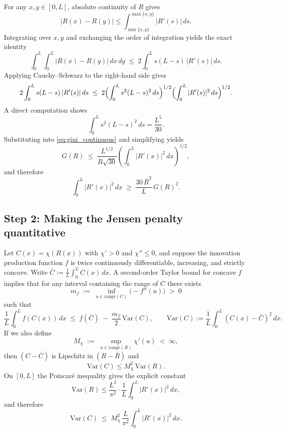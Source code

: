 \documentclass[12pt,a4paper]{article}
\theoremstyle{definition}
\begin{document}
For any $x,y\in[0,L]$, absolute continuity of $R$ gives
\[
|R(x)-R(y)| \le \int_{\min\{x,y\}}^{\max\{x,y\}} |R'(s)|\,ds.
\]
Integrating over $x,y$ and exchanging the order of integration yields the exact identity
\begin{equation}
  \int_0^L\int_0^L |R(x)-R(y)|\,dx\,dy
  \;\le\;
  2\int_0^L s(L-s)\,|R'(s)|\,ds.
  \label{eq:double_integral_weight}
\end{equation}
Applying Cauchy--Schwarz to the right-hand side gives
\[
2\int_0^L s(L-s)\,|R'(s)|\,ds
\;\le\;
2\Bigl(\int_0^L s^2(L-s)^2\,ds\Bigr)^{1/2}\Bigl(\int_0^L |R'(s)|^2\,ds\Bigr)^{1/2}.
\]
A direct computation shows
\[
\int_0^L s^2(L-s)^2\,ds = \frac{L^5}{30}.
\]
Substituting into \eqref{eq:gini_continuous} and simplifying yields
\begin{equation}
  G(R)
  \;\le\;
  \frac{L^{1/2}}{\bar R\sqrt{30}}
  \left(\int_0^L |R'(x)|^2\,dx\right)^{1/2},
  \label{eq:gini_gradient_bound}
\end{equation}
and therefore
\begin{equation}
  \int_0^L |R'(x)|^2\,dx
  \;\ge\;
  \frac{30\,\bar R^2}{L}\,G(R)^2.
  \label{eq:gradient_lower_bound_from_gini}
\end{equation}

\subsection{Step 2: Making the Jensen penalty quantitative}

Let $C(x)=\chi(R(x))$ with $\chi'>0$ and $\chi''\le 0$, and suppose the innovation
production function $f$ is twice continuously differentiable, increasing, and strictly concave.
Write $\bar C := \frac{1}{L}\int_0^L C(x)\,dx$.
A second-order Taylor bound for concave $f$ implies that for any interval containing the range
of $C$ there exists
\[
m_f \;:=\; \inf_{u \in \mathrm{range}(C)}\bigl(-f''(u)\bigr) \;>\; 0
\]
such that
\begin{equation}
  \frac{1}{L}\int_0^L f(C(x))\,dx
  \;\le\;
  f(\bar C) \;-\; \frac{m_f}{2}\,\mathrm{Var}(C),
  \qquad
  \mathrm{Var}(C):=\frac{1}{L}\int_0^L (C(x)-\bar C)^2\,dx.
  \label{eq:quantitative_jensen}
\end{equation}
If we also define
\[
M_\chi \;:=\; \sup_{u\in \mathrm{range}(R)} \chi'(u) \;<\;\infty,
\]
then $(C-\bar C)$ is Lipschitz in $(R-\bar R)$ and
\[
\mathrm{Var}(C)\le M_\chi^2\,\mathrm{Var}(R).
\]
On $[0,L]$ the Poincar\'e inequality gives the explicit constant
\[
\mathrm{Var}(R)\le \frac{L^2}{\pi^2}\cdot \frac{1}{L}\int_0^L |R'(x)|^2\,dx,
\]
and therefore
\begin{equation}
  \mathrm{Var}(C)
  \;\le\;
  M_\chi^2\,\frac{L}{\pi^2}\int_0^L |R'(x)|^2\,dx.
  \label{eq:varC_gradR}
\end{equation}
\end{document}
